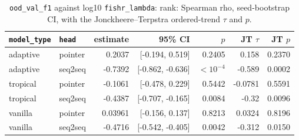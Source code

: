 \documentclass[10pt]{article}
\begin{document}
{\small
\begin{longtable}{llrrrrr}
\caption{\texttt{ood\_val\_f1} against log10 \texttt{fishr\_lambda}: rank: Spearman rho, seed-bootstrap CI, with the Jonckheere--Terpstra ordered-trend $\tau$ and $p$.}\label{tab:trend-ood_val_f1}\\
\toprule
\texttt{model\_type} & \texttt{head} & estimate & 95\% CI & $p$ & JT $\tau$ & JT $p$\\
\midrule
\endhead
adaptive & pointer & 0.2037 & [-0.194, 0.519] & 0.2405 & 0.158 & 0.2370\\
adaptive & seq2seq & -0.7392 & [-0.862, -0.636] & $<10^{-4}$ & -0.589 & 0.0002\\
tropical & pointer & -0.1061 & [-0.478, 0.229] & 0.5442 & -0.0781 & 0.5591\\
tropical & seq2seq & -0.4387 & [-0.707, -0.165] & 0.0084 & -0.32 & 0.0096\\
vanilla & pointer & 0.03961 & [-0.156, 0.137] & 0.8213 & 0.0324 & 0.8196\\
vanilla & seq2seq & -0.4716 & [-0.542, -0.405] & 0.0042 & -0.312 & 0.0150\\
\bottomrule
\end{longtable}
}
\end{document}
